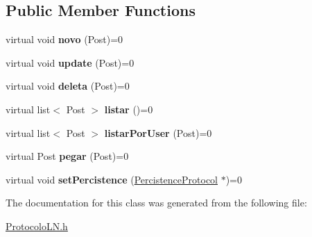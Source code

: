 \subsection*{Public Member Functions}
\begin{DoxyCompactItemize}
\item 
\hypertarget{class_post_protocol_a29c8f475d6c5f284ad94d51aeaf0428a}{virtual void {\bfseries novo} (Post)=0}\label{class_post_protocol_a29c8f475d6c5f284ad94d51aeaf0428a}

\item 
\hypertarget{class_post_protocol_a7cac627996f60cc8d3a3ac79541906da}{virtual void {\bfseries update} (Post)=0}\label{class_post_protocol_a7cac627996f60cc8d3a3ac79541906da}

\item 
\hypertarget{class_post_protocol_ada9f6161a46b9adf85b404785e18becd}{virtual void {\bfseries deleta} (Post)=0}\label{class_post_protocol_ada9f6161a46b9adf85b404785e18becd}

\item 
\hypertarget{class_post_protocol_a590d2c0f349b99a33e69661fffdc078e}{virtual list$<$ Post $>$ {\bfseries listar} ()=0}\label{class_post_protocol_a590d2c0f349b99a33e69661fffdc078e}

\item 
\hypertarget{class_post_protocol_addfc8f6b5ffd5af04f0ef6a1a3b7d8f1}{virtual list$<$ Post $>$ {\bfseries listar\-Por\-User} (Post)=0}\label{class_post_protocol_addfc8f6b5ffd5af04f0ef6a1a3b7d8f1}

\item 
\hypertarget{class_post_protocol_a6455f6e36f21ba008e3529e77185d884}{virtual Post {\bfseries pegar} (Post)=0}\label{class_post_protocol_a6455f6e36f21ba008e3529e77185d884}

\item 
\hypertarget{class_post_protocol_a9ed7d312b4726aba6bc880d90ec844a7}{virtual void {\bfseries set\-Percistence} (\hyperlink{class_percistence_protocol}{Percistence\-Protocol} $\ast$)=0}\label{class_post_protocol_a9ed7d312b4726aba6bc880d90ec844a7}

\end{DoxyCompactItemize}


The documentation for this class was generated from the following file\-:\begin{DoxyCompactItemize}
\item 
\hyperlink{_protocolo_l_n_8h}{Protocolo\-L\-N.\-h}\end{DoxyCompactItemize}
